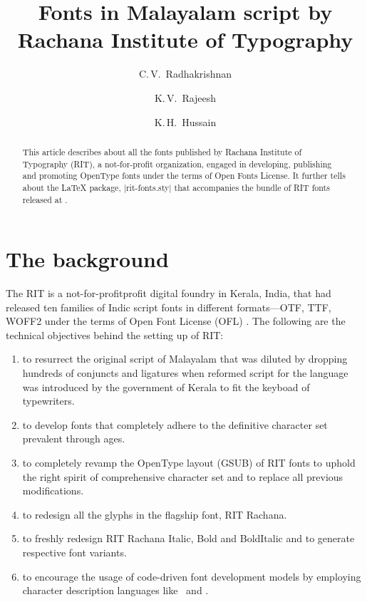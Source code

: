 \documentclass[onecolumn,final]{ltugboat}
\def\tsm{\small}
\def\rit{{\tsm RIT}\xspace}
\def\otf{{\tsm OTF}\xspace}
\def\ttf{{\tsm TTF}\xspace}
\def\woff{{\tsm WOFF2}\xspace}
\def\ofl{{\tsm OFL}\xspace}
\begin{document}
\setcounter{page}{1}

\title{Fonts in Malayalam script by Rachana Institute of Typography}

\author{C.\,V.~Radhakrishnan}
\address{River Valley Technologies, River Valley Campus, Malayinkeezh,
  Trivandrum 695571, India} 

\author{K.\,V.~Rajeesh}
\address{Rachana Institute of Typography}

\author{K.\,H.~Hussain}
\address{Rachana Institute of Typography}

\maketitle

\begin{abstract}
  This article describes about all the fonts published by Rachana
  Institute of Typography (\rit), a not-for-profit organization, engaged
  in developing, publishing and promoting OpenType fonts under
  the terms of Open Fonts License.  It further tells about the
  \LaTeX{} package, |rit-fonts.sty| that accompanies the bundle of
  \rit fonts released at \CTAN.
\end{abstract}

\section{The background}

The \rit is a not-for-profitprofit digital foundry in Kerala, India,
that had released ten families of Indic script fonts in different
formats---\otf, \ttf, \woff under the terms of Open Font License
(\ofl) \cite{ofl}.  The following are the technical objectives behind
the setting up of \rit:
\begin{enumerate}
\item to resurrect the original script of Malayalam that was diluted
  by dropping hundreds of conjuncts and ligatures when reformed script
  for the language was introduced by the government of Kerala to fit
  the keyboad of typewriters.
\item to develop fonts that completely adhere to the definitive
  character set prevalent through ages.
\item to completely revamp the OpenType layout {\tsm (GSUB)} of \rit
  fonts to uphold the right spirit of comprehensive character set and
  to replace all previous modifications.
\item to redesign all the glyphs in the flagship font, \rit Rachana.
\item to freshly redesign \rit Rachana Italic, Bold and BoldItalic and
  to generate respective font variants.
\item to encourage the usage of code-driven font development models by
  employing character description languages like \MF\ and \MP.
\end{enumerate}
\end{document}
